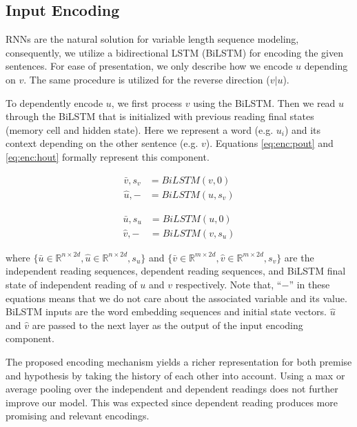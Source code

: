 \documentclass[11pt,a4paper]{article}
\begin{document}
	\subsection{Input Encoding}
	\label{sec:enc}
	
	RNNs are the natural solution for variable length sequence modeling, consequently, we utilize a bidirectional LSTM (BiLSTM) \cite{lstm} for encoding the given sentences. For ease of presentation, we only describe how we encode $u$ depending on $v$. The same procedure is utilized for the reverse direction ($v|u$). 
	
	To dependently encode $u$, we first process $v$ using the BiLSTM. Then we read $u$ through the BiLSTM that is initialized with previous reading final states (memory cell and hidden state). Here we represent a word (e.g. $u_i$) and its context depending on the other sentence (e.g. $v$).  Equations \ref{eq:enc:pout} and \ref{eq:enc:hout} formally represent this component.
	
	\begin{equation}
	\begin{split}
	\bar{v}, s_v &= \textit{BiLSTM}(v, 0) \\
	\hat{u}, - &= \textit{BiLSTM}(u, s_v)
	\end{split}
	\label{eq:enc:pout}
	\end{equation}
	
	\begin{equation}
	\begin{split}
	\bar{u}, s_u &= \textit{BiLSTM}(u, 0) \\
	\hat{v}, - &= \textit{BiLSTM}(v, s_u)
	\end{split}
	\label{eq:enc:hout}
	\end{equation}
	
	\noindent where $\{\bar{u} \in \mathbb{R}^{n \times 2d}, \hat{u} \in \mathbb{R}^{n \times 2d}, s_u \}$ and $\{\bar{v} \in \mathbb{R}^{m \times 2d}, \hat{v} \in \mathbb{R}^{m \times 2d}, s_v \}$ are the independent reading sequences, dependent reading sequences, and BiLSTM final state of independent reading of $u$ and $v$ respectively. Note that, ``$-$'' in these equations means that we do not care about the associated variable and its value. BiLSTM inputs are the word embedding sequences and initial state vectors. $\hat{u}$ and $\hat{v}$ are passed to the next layer as the output of the input encoding component. 
	
	The proposed encoding mechanism yields a richer representation for both premise and hypothesis by taking the history of each other into account. Using a max or average pooling over the independent and dependent readings does not further improve our model. This was expected since dependent reading produces more promising and relevant encodings.
	
\end{document}
